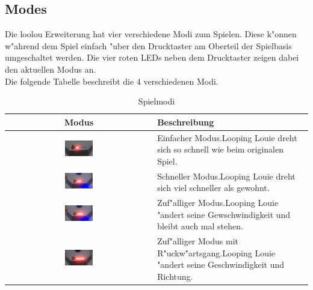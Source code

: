 \subsection{Modes}

Die loolou Erweiterung hat vier verschiedene Modi zum Spielen. Diese k"onnen w"ahrend dem Spiel einfach "uber den Drucktaster am Oberteil der Spielbasis umgeschaltet werden.
Die vier roten LEDs neben dem Drucktaster zeigen dabei den aktuellen Modus an. \\
Die folgende Tabelle beschreibt die 4 verschiedenen Modi.

\vspace{1cm}
\begin{table}[ht]
	\centering

	\begin{tabular}{ c | p{8cm} } 
		Modus								& Beschreibung \\ 
		\hline \hline
		\includegraphics[width=0.2\textwidth]{pictures/mode_1.jpg}	& Einfacher Modus.\newline Looping Louie dreht sich so schnell wie beim originalen Spiel.  \\
		\hline
		\includegraphics[width=0.2\textwidth]{pictures/mode_2.jpg}	& Schneller Modus.\newline Looping Louie dreht sich viel schneller als gewohnt. \\
		\hline
		\includegraphics[width=0.2\textwidth]{pictures/mode_3.jpg}	& Zuf"alliger Modus.\newline Looping Louie "andert seine Gewschwindigkeit und bleibt auch mal stehen. \\
		\hline
		\includegraphics[width=0.2\textwidth]{pictures/mode_4.jpg}	& Zuf"alliger Modus mit R"uckw"artsgang.\newline Looping Louie "andert seine Geschwindigkeit und Richtung. \\
		\hline
	\end{tabular}

	\caption{Spielmodi}
	\label{table:mode}
\end{table}
\vspace{0.5cm}

